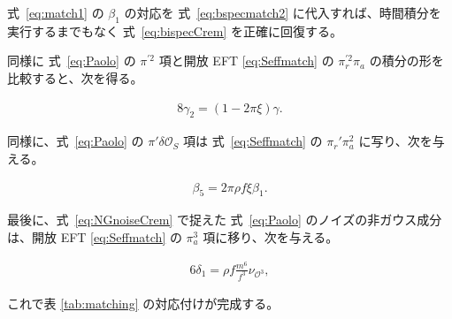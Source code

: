 \documentclass[a4paper,11pt]{ltjsarticle}
\numberwithin{equation}{section}
\def\pia{\pi_{a}}
\def\pir{\pi_{r}}
\newcommand{\Eq}[1]{Eq.~(\ref{#1})}
\renewcommand{\Eq}[1]{式~\eqref{#1}}
\begin{document}
\Eq{eq:match1} の $\beta_1$ の対応を \Eq{eq:bspecmatch2} に代入すれば、時間積分を実行するまでもなく \Eq{eq:bispecCrem} を正確に回復する。

同様に \Eq{eq:Paolo} の $\pi^{\prime2}$ 項と開放 EFT \eqref{eq:Seffmatch} の $\pir^{\prime2}\pia$ の積分の形を比較すると、次を得る。

\begin{align}
    8\gamma_2 =\left(1-2 \pi \xi\right) \gamma.
\end{align}

同様に、\Eq{eq:Paolo} の $\pi'\delta\mathcal{O}_S$ 項は \Eq{eq:Seffmatch} の $\pir'\pia^2$ に写り、次を与える。

\begin{align}
    \beta_5 = 2\pi\rho f\xi \beta_1.
\end{align}

最後に、\Eq{eq:NGnoiseCrem} で捉えた \Eq{eq:Paolo} のノイズの非ガウス成分は、開放 EFT \eqref{eq:Seffmatch} の $\pia^3$ 項に移り、次を与える。

\begin{align}
    6\delta_1 = \rho f \frac{m^6}{f^3} \nu_{\mathcal{O}^3} ,
\end{align}

これで表 \ref{tab:matching} の対応付けが完成する。
\end{document}
